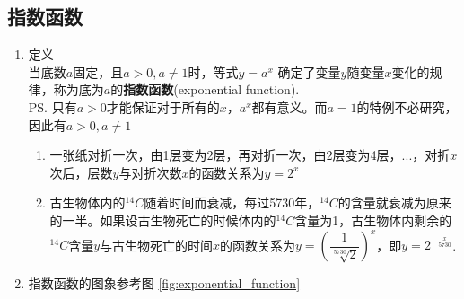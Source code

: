 \subsection*{指数函数}
\begin{enumerate}
    \item 定义 \\
    当底数$a$固定，且$a>0, a \neq 1$时，等式$y=a^x$ 确定了变量$y$随变量$x$变化的规律，称为底为$a$的\textbf{指数函数}(exponential function). \\
    \ps 只有$a>0$才能保证对于所有的$x$，$a^x$都有意义。而$a=1$的特例不必研究，因此有$a>0, a \neq 1$

    \begin{example}
        \begin{enumerate}
            \item 一张纸对折一次，由1层变为2层，再对折一次，由2层变为4层，...，对折$x$次后，层数$y$与对折次数$x$的函数关系为$y=2^x$
            \item 古生物体内的$^{14}C$随着时间而衰减，每过5730年，$^{14}C$的含量就衰减为原来的一半。如果设古生物死亡的时候体内的$^{14}C$含量为1，古生物体内剩余的$^{14}C$含量$y$与古生物死亡的时间$x$的函数关系为$y = \left(\dfrac{1}{\sqrt[5730]{2}}\right)^x$，即$y = 2^{-\frac{x}{5730}}$.
        \end{enumerate}
    \end{example}

    \item 指数函数的图象参考图 \ref{fig:exponential_function}
        

\end{enumerate}
